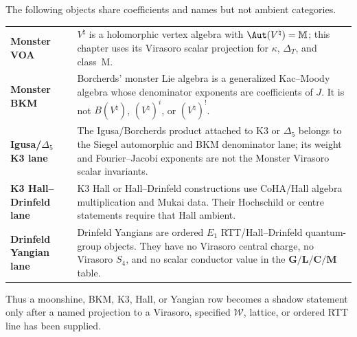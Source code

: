 \begin{remark}%
\label{rem:moonshine-taxonomy-firewall}%
%
%
%
The following objects share coefficients and names but not ambient
categories.
\begin{center}
\begin{tabular}{p{3.2cm}p{8.9cm}}
\textbf{Monster VOA} &
 $V^\natural$ is a holomorphic vertex algebra with
 $\Aut(V^\natural)=\mathbb{M}$; this chapter uses its Virasoro
 scalar projection for $\kappa$, $\Delta_T$, and class~M.\\[2mm]
\textbf{Monster BKM} &
 Borcherds' monster Lie algebra is a generalized
 Kac--Moody algebra whose denominator exponents are coefficients of
 $J$. It is not $B(V^\natural)$, $(V^\natural)^i$, or
 $(V^\natural)^!$.\\[2mm]
\textbf{Igusa/$\Delta_5$ K3 lane} &
 The Igusa/Borcherds product attached to K3 or $\Delta_5$ belongs to
 the Siegel automorphic and BKM denominator lane; its weight and
 Fourier--Jacobi exponents are not the Monster Virasoro scalar
 invariants.\\[2mm]
\textbf{K3 Hall--Drinfeld lane} &
 K3 Hall or Hall--Drinfeld constructions use CoHA/Hall algebra
 multiplication and Mukai data. Their Hochschild or centre statements
 require that Hall ambient.\\[2mm]
\textbf{Drinfeld Yangian lane} &
 Drinfeld Yangians are ordered $E_1$ RTT/Hall--Drinfeld quantum-group
 objects. They have no Virasoro central charge, no Virasoro
 $S_4$, and no scalar conductor value in the
 $\mathbf{G}/\mathbf{L}/\mathbf{C}/\mathbf{M}$ table.
\end{tabular}
\end{center}
Thus a moonshine, BKM, K3, Hall, or Yangian row becomes a shadow
statement only after a named projection to a Virasoro, specified
$\mathcal W$, lattice, or ordered RTT line has been supplied.
\end{remark}

